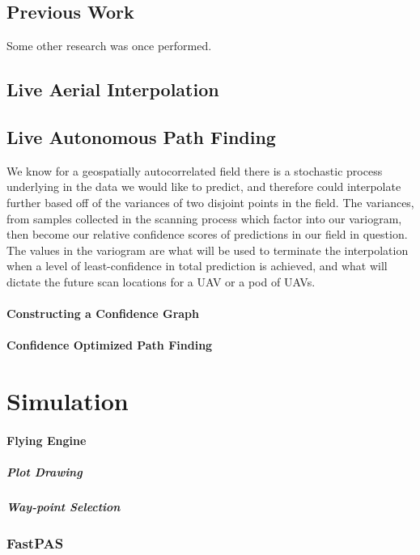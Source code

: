 \documentclass[11pt]{ucthesis}
\begin{document}
\chapter{Previous Work}
Some other research was once performed.

\chapter{Live Aerial Interpolation}

\chapter{Live Autonomous Path Finding}
We know for a geospatially autocorrelated field there is a stochastic process underlying in the data we would like to predict, and therefore could interpolate further based off of the variances of two disjoint points in the field. The variances, from samples collected in the scanning process which factor into our variogram, then become our relative confidence scores of predictions in our field in question. The values in the variogram are what will be used to terminate the interpolation when a level of least-confidence in total prediction is achieved, and what will dictate the future scan locations for a UAV or a pod of UAVs.
\subsection{Constructing a Confidence Graph}
\subsection{Confidence Optimized Path Finding}

\part{Simulation}
\subsection{Flying Engine}
\subsubsection{Plot Drawing}
\subsubsection{Way-point Selection}

\section{FastPAS}
\end{document}
